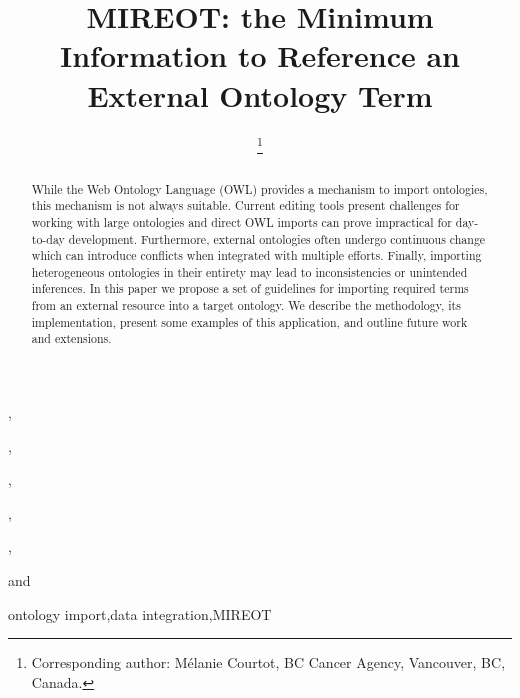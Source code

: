 \documentclass[jou]{ao2e}%
\begin{document}
\begin{frontmatter}                           %
%
\title{ MIREOT: the Minimum Information to Reference an External Ontology Term}

\author[A]{ %
\thanks{Corresponding author: M\'elanie Courtot, BC Cancer Agency, Vancouver, BC, Canada.}},
\author[B]{ },
\author[C]{ },
\author[D]{ },
\author[E]{ },
\author[A]{ }
and
\author[F]{ }

\address[A]{BC Cancer Agency, Vancouver, BC, Canada\\
E-mail: mcourtot@gmail.com, rbrinkman@bccrc.ca}

\address[B]{Abcam plc, 332 Cambridge Science Park, Cambridge, CB4 OWN, UK\\
E-mail: fgibson@gmail.com}

\address[C]{CISBAN and School of Computing Science, Newcastle University, Newcastle upon Tyne, UK\\
E-mail: a.l.lister@newcastle.ac.uk}

\address[D]{The European Bioinformatics Institute, Cambridge, CB10 1SD, UK\\
E-mail: malone@ebi.ac.uk}

\address[E]{Institute of Medical Biometry and Medical Informatics (IMBI), University Medical Center, 70104 Freiburg, Germany\\
E-mail: schober@imbi.uni-freiburg.de}

\address[F]{Science Commons, Cambridge, MA, USA\\
E-mail: alanruttenberg@gmail.com}


\begin{abstract}
While the Web Ontology Language (OWL) provides a mechanism to import ontologies, this mechanism is not always suitable.
Current editing tools present challenges for working with large ontologies and direct OWL imports can prove impractical for day-to-day development.
Furthermore, external ontologies often undergo continuous change which can introduce conflicts when integrated with multiple efforts.
Finally, importing heterogeneous ontologies in their entirety may lead to inconsistencies or unintended inferences.
In this paper we propose a set of guidelines for importing required terms from an external resource into a target ontology.
We describe the methodology, its implementation, present some examples of this application, and outline future work and extensions.
\end{abstract}


\begin{keyword}
ontology import\sep data integration\sep MIREOT
\end{keyword}

\end{frontmatter}
\end{document}
